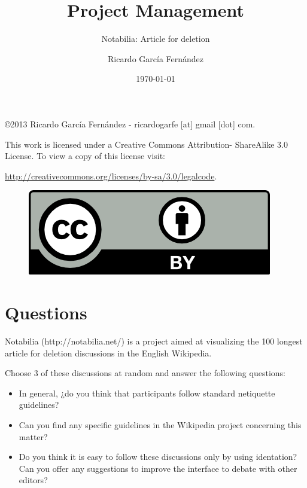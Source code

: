 \documentclass[11pt]{scrartcl}
\title{\textbf{Project Management}}
\subtitle{Notabilia: Article for deletion}
\author{Ricardo Garc\'ia Fern\'andez}
\date{\today}
\begin{document}
\maketitle

\vfill

\begin{flushright}
    \copyright  2013 Ricardo Garc\'ia Fern\'andez - ricardogarfe [at] gmail [dot] com.

    This work is licensed under a Creative Commons Attribution- ShareAlike 3.0 License.
    To view a copy of this license visit:
 
    \url{http://creativecommons.org/licenses/by-sa/3.0/legalcode}.
\end{flushright}

\begin{figure}[h]
    \begin{flushright}	
        \includegraphics{by}
        \label{fig:by-sa}
    \end{flushright}
\end{figure}

\newpage

\section{Questions}

Notabilia (http://notabilia.net/) is a project aimed at visualizing the 100 longest article for deletion discussions in the English Wikipedia.

Choose 3 of these discussions at random and answer the following questions:

\begin{itemize}
	\item In general, ¿do you think that participants follow standard netiquette guidelines?
	\item Can you find any specific guidelines in the Wikipedia project concerning this matter?
	\item Do you think it is easy to follow these discussions only by using identation? Can you offer any suggestions to improve the interface to debate with other editors?
\end{itemize}
\end{document}
